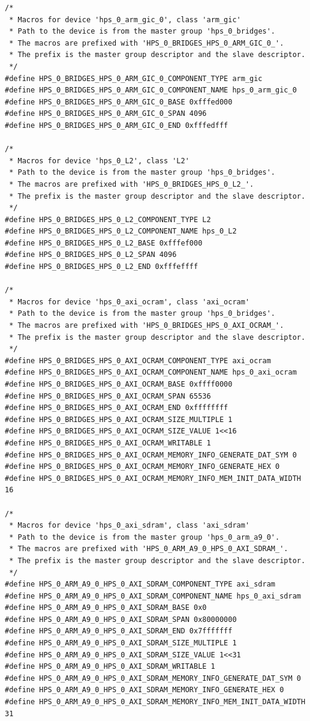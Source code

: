 \documentclass[conference]{IEEEtran}
\begin{document}
\begin{lstlisting}
/*
 * Macros for device 'hps_0_arm_gic_0', class 'arm_gic'
 * Path to the device is from the master group 'hps_0_bridges'.
 * The macros are prefixed with 'HPS_0_BRIDGES_HPS_0_ARM_GIC_0_'.
 * The prefix is the master group descriptor and the slave descriptor.
 */
#define HPS_0_BRIDGES_HPS_0_ARM_GIC_0_COMPONENT_TYPE arm_gic
#define HPS_0_BRIDGES_HPS_0_ARM_GIC_0_COMPONENT_NAME hps_0_arm_gic_0
#define HPS_0_BRIDGES_HPS_0_ARM_GIC_0_BASE 0xfffed000
#define HPS_0_BRIDGES_HPS_0_ARM_GIC_0_SPAN 4096
#define HPS_0_BRIDGES_HPS_0_ARM_GIC_0_END 0xfffedfff

/*
 * Macros for device 'hps_0_L2', class 'L2'
 * Path to the device is from the master group 'hps_0_bridges'.
 * The macros are prefixed with 'HPS_0_BRIDGES_HPS_0_L2_'.
 * The prefix is the master group descriptor and the slave descriptor.
 */
#define HPS_0_BRIDGES_HPS_0_L2_COMPONENT_TYPE L2
#define HPS_0_BRIDGES_HPS_0_L2_COMPONENT_NAME hps_0_L2
#define HPS_0_BRIDGES_HPS_0_L2_BASE 0xfffef000
#define HPS_0_BRIDGES_HPS_0_L2_SPAN 4096
#define HPS_0_BRIDGES_HPS_0_L2_END 0xfffeffff

/*
 * Macros for device 'hps_0_axi_ocram', class 'axi_ocram'
 * Path to the device is from the master group 'hps_0_bridges'.
 * The macros are prefixed with 'HPS_0_BRIDGES_HPS_0_AXI_OCRAM_'.
 * The prefix is the master group descriptor and the slave descriptor.
 */
#define HPS_0_BRIDGES_HPS_0_AXI_OCRAM_COMPONENT_TYPE axi_ocram
#define HPS_0_BRIDGES_HPS_0_AXI_OCRAM_COMPONENT_NAME hps_0_axi_ocram
#define HPS_0_BRIDGES_HPS_0_AXI_OCRAM_BASE 0xffff0000
#define HPS_0_BRIDGES_HPS_0_AXI_OCRAM_SPAN 65536
#define HPS_0_BRIDGES_HPS_0_AXI_OCRAM_END 0xffffffff
#define HPS_0_BRIDGES_HPS_0_AXI_OCRAM_SIZE_MULTIPLE 1
#define HPS_0_BRIDGES_HPS_0_AXI_OCRAM_SIZE_VALUE 1<<16
#define HPS_0_BRIDGES_HPS_0_AXI_OCRAM_WRITABLE 1
#define HPS_0_BRIDGES_HPS_0_AXI_OCRAM_MEMORY_INFO_GENERATE_DAT_SYM 0
#define HPS_0_BRIDGES_HPS_0_AXI_OCRAM_MEMORY_INFO_GENERATE_HEX 0
#define HPS_0_BRIDGES_HPS_0_AXI_OCRAM_MEMORY_INFO_MEM_INIT_DATA_WIDTH 16

/*
 * Macros for device 'hps_0_axi_sdram', class 'axi_sdram'
 * Path to the device is from the master group 'hps_0_arm_a9_0'.
 * The macros are prefixed with 'HPS_0_ARM_A9_0_HPS_0_AXI_SDRAM_'.
 * The prefix is the master group descriptor and the slave descriptor.
 */
#define HPS_0_ARM_A9_0_HPS_0_AXI_SDRAM_COMPONENT_TYPE axi_sdram
#define HPS_0_ARM_A9_0_HPS_0_AXI_SDRAM_COMPONENT_NAME hps_0_axi_sdram
#define HPS_0_ARM_A9_0_HPS_0_AXI_SDRAM_BASE 0x0
#define HPS_0_ARM_A9_0_HPS_0_AXI_SDRAM_SPAN 0x80000000
#define HPS_0_ARM_A9_0_HPS_0_AXI_SDRAM_END 0x7fffffff
#define HPS_0_ARM_A9_0_HPS_0_AXI_SDRAM_SIZE_MULTIPLE 1
#define HPS_0_ARM_A9_0_HPS_0_AXI_SDRAM_SIZE_VALUE 1<<31
#define HPS_0_ARM_A9_0_HPS_0_AXI_SDRAM_WRITABLE 1
#define HPS_0_ARM_A9_0_HPS_0_AXI_SDRAM_MEMORY_INFO_GENERATE_DAT_SYM 0
#define HPS_0_ARM_A9_0_HPS_0_AXI_SDRAM_MEMORY_INFO_GENERATE_HEX 0
#define HPS_0_ARM_A9_0_HPS_0_AXI_SDRAM_MEMORY_INFO_MEM_INIT_DATA_WIDTH 31


\end{lstlisting}
\end{document}
